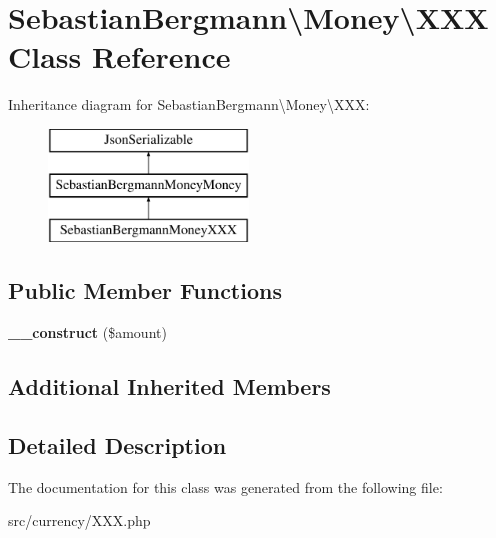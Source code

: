 \hypertarget{classSebastianBergmann_1_1Money_1_1XXX}{}\section{Sebastian\+Bergmann\textbackslash{}Money\textbackslash{}X\+X\+X Class Reference}
\label{classSebastianBergmann_1_1Money_1_1XXX}
Inheritance diagram for Sebastian\+Bergmann\textbackslash{}Money\textbackslash{}X\+X\+X\+:\begin{figure}[H]
\begin{center}
\leavevmode
\includegraphics[height=3.000000cm]{classSebastianBergmann_1_1Money_1_1XXX}
\end{center}
\end{figure}
\subsection*{Public Member Functions}
\begin{DoxyCompactItemize}
\item 
\hypertarget{classSebastianBergmann_1_1Money_1_1XXX_a7a14e0b1ad6f46bab86dd05053109665}{}{\bfseries \+\_\+\+\_\+construct} (\$amount)\label{classSebastianBergmann_1_1Money_1_1XXX_a7a14e0b1ad6f46bab86dd05053109665}

\end{DoxyCompactItemize}
\subsection*{Additional Inherited Members}


\subsection{Detailed Description}


The documentation for this class was generated from the following file\+:\begin{DoxyCompactItemize}
\item 
src/currency/X\+X\+X.\+php\end{DoxyCompactItemize}
